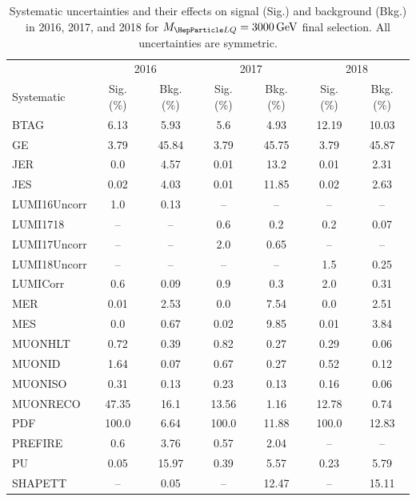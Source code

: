 \begin{table}[H]
	\begin{center}
        \begin{footnotesize}
			\caption{Systematic uncertainties and their effects on signal (Sig.) and background (Bkg.) in 2016, 2017, and 2018 for $\MLQ = \SI{3000}{GeV}$ final selection. All uncertainties are symmetric.}
			\begin{tabular}{lcccccc} \hline \hline
				& \multicolumn{2}{c}{2016} & \multicolumn{2}{c}{2017} & \multicolumn{2}{c}{2018} \\
				Systematic & Sig. (\%) & Bkg. (\%) & Sig. (\%) & Bkg. (\%) & Sig. (\%) & Bkg. (\%) \\ \hline
				BTAG &  6.13  &  5.93 &  5.6  &  4.93 &  12.19  &  10.03 \\
				GE &  3.79  &  45.84 &  3.79  &  45.75 &  3.79  &  45.87 \\
				JER &  0.0  &  4.57 &  0.01  &  13.2 &  0.01  &  2.31 \\
				JES &  0.02  &  4.03 &  0.01  &  11.85 &  0.02  &  2.63 \\
				LUMI16Uncorr &  1.0  &  0.13 & -- & -- & -- & -- \\
				LUMI1718 & -- & -- &  0.6  &  0.2 &  0.2  &  0.07 \\
				LUMI17Uncorr & -- & -- &  2.0  &  0.65 & -- & -- \\
				LUMI18Uncorr & -- & -- & -- & -- &  1.5  &  0.25 \\
				LUMICorr &  0.6  &  0.09 &  0.9  &  0.3 &  2.0  &  0.31 \\
				MER &  0.01  &  2.53 &  0.0  &  7.54 &  0.0  &  2.51 \\
				MES &  0.0  &  0.67 &  0.02  &  9.85 &  0.01  &  3.84 \\
				MUONHLT &  0.72  &  0.39 &  0.82  &  0.27 &  0.29  &  0.06 \\
				MUONID &  1.64  &  0.07 &  0.67  &  0.27 &  0.52  &  0.12 \\
				MUONISO &  0.31  &  0.13 &  0.23  &  0.13 &  0.16  &  0.06 \\
				MUONRECO &  47.35  &  16.1 &  13.56  &  1.16 &  12.78  &  0.74 \\
				PDF &  100.0  &  6.64 &  100.0  &  11.88 &  100.0  &  12.83 \\
				PREFIRE &  0.6  &  3.76 &  0.57  &  2.04 & -- & -- \\
				PU &  0.05  &  15.97 &  0.39  &  5.57 &  0.23  &  5.79 \\
				SHAPETT & -- &  0.05 & -- &  12.47 & -- &  15.11 \\

\end{tabular}
\end{footnotesize}
\end{center}
\end{table}
